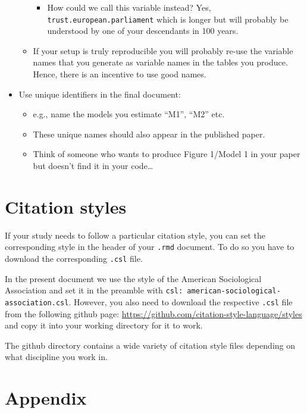 \documentclass[12pt,]{article}
\providecommand{\tightlist}{%
  \setlength{\itemsep}{0pt}\setlength{\parskip}{0pt}}
\theoremstyle{definition}
\theoremstyle{definition}
\theoremstyle{definition}
\theoremstyle{remark}
\begin{document}
\begin{itemize}
\begin{itemize}
    \begin{itemize}
    \tightlist
    \item
      How could we call this variable instead? Yes,
      \texttt{trust.european.parliament} which is longer but will
      probably be understood by one of your descendants in 100 years.
    \end{itemize}
  \item
    If your setup is truly reproducible you will probably re-use the
    variable names that you generate as variable names in the tables you
    produce. Hence, there is an incentive to use good names.
  \end{itemize}
\item
  Use unique identifiers in the final document:

  \begin{itemize}
  \tightlist
  \item
    e.g., name the models you estimate ``M1'', ``M2'' etc.
  \item
    These unique names should also appear in the published paper.
  \item
    Think of someone who wants to produce Figure 1/Model 1 in your paper
    but doesn't find it in your code\ldots{}
  \end{itemize}
\end{itemize}

\section{Citation styles}\label{citation-styles}

If your study needs to follow a particular citation style, you can set
the corresponding style in the header of your \texttt{.rmd} document. To
do so you have to download the corresponding \texttt{.csl} file.

In the present document we use the style of the American Sociological
Association and set it in the preamble with
\texttt{csl:\ american-sociological-association.csl}. However, you also
need to download the respective \texttt{.csl} file from the following
github page: \url{https://github.com/citation-style-language/styles} and
copy it into your working directory for it to work.

The github directory contains a wide variety of citation style files
depending on what discipline you work in.

\section{Appendix}\label{appendix}
\end{document}
